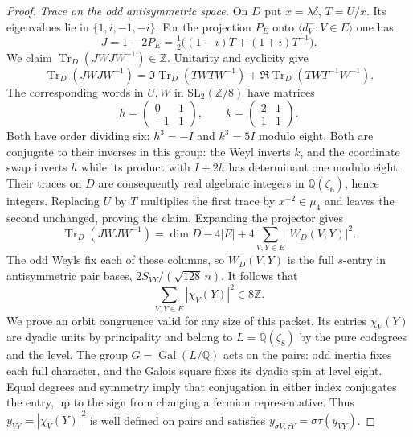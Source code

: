 \documentclass[11pt,a4paper]{article}
\numberwithin{equation}{section}
\theoremstyle{remark}
\newcommand{\Gal}{\operatorname{Gal}}
\newcommand{\ZZ}{\mathbb Z}
\newcommand{\QQ}{\mathbb Q}
\newcommand{\Tr}{\operatorname{Tr}}
\begin{document}
\begin{proof}
\smallskip\noindent\emph{Trace on the odd antisymmetric space.}
On $D$ put $x=\lambda\delta$, $T=U/x$. Its eigenvalues lie in
$\{1,i,-1,-i\}$. For the projection $P_E$ onto
$\langle d_V^-:V\in E\rangle$ one has
\[
 J=1-2P_E=\tfrac12\big((1-i)T+(1+i)T^{-1}\big).
\]
We claim $\Tr_D(JWJW^{-1})\in\ZZ$. Unitarity and cyclicity give
\[
 \Tr_D(JWJW^{-1})
 =\Im\Tr_D(TWTW^{-1})+\Re\Tr_D(TWT^{-1}W^{-1}).
\]
The corresponding words in $U,W$ in $\mathrm{SL}_2(\ZZ/8)$ have matrices
\[
 h=\begin{pmatrix}0&1\\-1&1\end{pmatrix},
 \qquad k=\begin{pmatrix}2&1\\1&1\end{pmatrix}.
\]
Both have order dividing six: $h^3=-I$ and $k^3=5I$ modulo eight.
Both are conjugate to their inverses in this group: the Weyl inverts
$k$, and the coordinate swap inverts $h$ while its product with
$I+2h$ has determinant one modulo eight. Their traces on $D$
are consequently real algebraic integers in $\QQ(\zeta_6)$, hence
integers. Replacing $U$ by $T$ multiplies the first trace by
$x^{-2}\in\mu_4$ and leaves the second unchanged, proving the claim.
Expanding the projector gives
\[
 \Tr_D(JWJW^{-1})=\dim D-4|E|+4\sum_{V,Y\in E}|W_D(V,Y)|^2 .
\]
The odd Weyls fix each of these columns, so $W_D(V,Y)$ is the full
$s$-entry in antisymmetric pair bases, $2S_{VY}/(\sqrt{128}\,n)$.
It follows that
\begin{equation}\label{found:S:key:eq:ferm-eight}
                    \sum_{V,Y\in E}|\chi_V(Y)|^2\in8\ZZ .
\end{equation}
We prove an orbit congruence valid for any size of this packet.
Its entries $\chi_V(Y)$ are dyadic units by principality and belong to
$L=\QQ(\zeta_8)$ by the pure codegrees and the level. The group
$G=\Gal(L/\QQ)$ acts on the pairs: odd inertia fixes each full
character, and the Galois square fixes its dyadic spin at level
eight. Equal degrees and symmetry imply that conjugation in either
index conjugates the entry, up to the sign from changing a fermion
representative. Thus $y_{VY}=|\chi_V(Y)|^2$ is well defined on
pairs and satisfies $y_{\sigma V,\tau Y}=\sigma\tau(y_{VY})$.


\end{proof}
\end{document}

